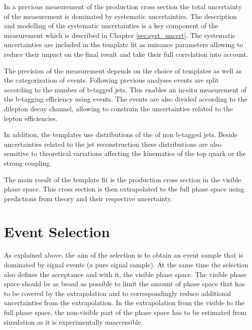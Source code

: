 In a previous measurement of the \ttbar production cross section \cite{Khachatryan:2016kzg} the total uncertainty of the measurement is dominated by systematic uncertainties. The description and modelling of the systematic uncertainties is a key component of the measurement which is described in Chapter \ref{sec:syst_uncert}. 
The systematic uncertainties are included in the template fit as nuisance parameters allowing to reduce their impact on the final result and take their full correlation into account.

The precision of the measurement depends on the choice of templates as well as the categorization of events.
Following previous analyses \cite{Khachatryan:2016mqs} events are split according to the number of b-tagged jets. This enables an in-situ measurement of the b-tagging efficiency using \ttbar events.
The events are also divided according to the dilepton decay channel, allowing to constrain the uncertainties related to the lepton efficiencies.

In addition, the templates use distributions of the \pt of non b-tagged jets. Beside uncertainties related to the jet reconstruction these distributions are also sensitive to theoretical variations affecting the kinematics of the top quark or the strong coupling.

The main result of the template fit is the \ttbar production cross section in the visible phase space. This cross section is then extrapolated to the full phase space using predictions from theory and their
respective uncertainty.

\section{Event Selection}
\label{sec:xsec_sel}

As explained above, the aim of the selection is to obtain an event sample that is dominated by signal events (a pure signal sample). At the same time the selection also defines the acceptance and with it, the visible phase space. 
The visible phase space should be as broad as possible to limit the amount of phase space that has to be covered by the extrapolation and to correspondingly reduce additional uncertainties from the extrapolation. In the extrapolation from the visible to the full phase space, the non-visible part of the phase
space has to be estimated from simulation as it is experimentally unaccessible. 

